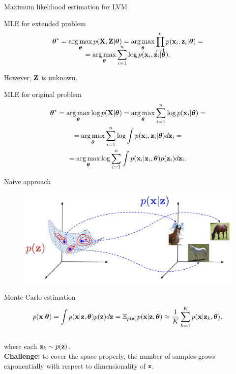 \begin{frame}{Maximum likelihood estimation for LVM}
	\begin{block}{MLE for extended problem}
		\vspace{-0.7cm}
		\begin{multline*}
			\vspace{-0.5cm}
			\btheta^* = \argmax_{\btheta} p(\bX, \bZ | \btheta) = \argmax_{\btheta} \prod_{i=1}^n p(\bx_i, \bz_i | \btheta) = \\ = \argmax_{\btheta} \sum_{i=1}^n \log p(\bx_i, \bz_i | \btheta).
		\end{multline*}
		\vspace{-0.5cm}
	\end{block}
	However, $\mathbf{Z}$ is unknown.
	\begin{block}{MLE for original problem}
		\vspace{-0.7cm}
		\begin{multline*}
			\boldsymbol{\theta}^* = \operatorname*{arg\,max}_{\boldsymbol{\theta}} \log p(\mathbf{X}| \boldsymbol{\theta}) = \operatorname*{arg\,max}_{\boldsymbol{\theta}} \sum_{i=1}^n \log p(\mathbf{x}_i | \boldsymbol{\theta}) = \\ =  \operatorname*{arg\,max}_{\boldsymbol{\theta}}  \sum_{i=1}^n \log \int p(\mathbf{x}_i, \mathbf{z}_i | \boldsymbol{\theta}) d \mathbf{z}_i = \\ = \operatorname*{arg\,max}_{\boldsymbol{\theta}} \log \sum_{i=1}^n \int p(\mathbf{x}_i| \mathbf{z}_i, \boldsymbol{\theta}) p(\mathbf{z}_i) d\mathbf{z}_i.
		\end{multline*}
	\end{block}
	
\end{frame}
\begin{frame}{Naive approach}
	\begin{figure}
		\includegraphics[width=.75\linewidth]{figs/lvm_diagram}
	\end{figure}
	\begin{block}{Monte-Carlo estimation}
		\vspace{-0.7cm}
		\[
			p(\mathbf{x} | \boldsymbol{\theta}) = \int p(\mathbf{x} | \mathbf{z}, \boldsymbol{\theta}) p(\mathbf{z}) d\mathbf{z} = \mathbb{E}_{p(\mathbf{z})} p(\mathbf{x} | \mathbf{z}, \boldsymbol{\theta}) \approx \frac{1}{K} \sum_{k=1}^{K} p(\mathbf{x} | \mathbf{z}_k, \boldsymbol{\theta}),
		\]
		\vspace{-0.5cm} \\
		where each $\mathbf{z}_k \sim p(\mathbf{z})$. \\
		\textbf{Challenge:} to cover the space properly, the number of samples grows exponentially with respect to dimensionality of $\mathbf{z}$. 
	\end{block}
\end{frame}
